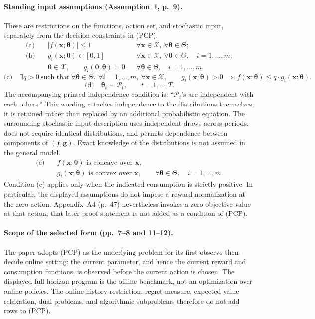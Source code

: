 \documentclass{article}
\begin{document}
\paragraph{Standing input assumptions (Assumption~1, p.~9).}
These are restrictions on the functions, action set, and stochastic input, separately from the decision constraints in (PCP).
\begin{align*}
\text{(a)}\quad
&|f(\boldsymbol{x};\boldsymbol{\theta})|\le 1
&&\forall\boldsymbol{x}\in\mathcal{X},\ \forall\boldsymbol{\theta}\in\Theta;\\
\text{(b)}\quad
&g_i(\boldsymbol{x};\boldsymbol{\theta})\in[0,1]
&&\forall\boldsymbol{x}\in\mathcal{X},\ \forall\boldsymbol{\theta}\in\Theta,
\quad i=1,\ldots,m;\\
&\boldsymbol{0}\in\mathcal{X},\qquad g_i(\boldsymbol{0};\boldsymbol{\theta})=0
&&\forall\boldsymbol{\theta}\in\Theta,\quad i=1,\ldots,m.
\end{align*}
\[
\text{(c)}\quad
\exists q>0\ \text{such that}\ 
\forall\boldsymbol{\theta}\in\Theta,\ \forall i=1,\ldots,m,
\ \forall\boldsymbol{x}\in\mathcal{X},\qquad
 g_i(\boldsymbol{x};\boldsymbol{\theta})>0
\ \Longrightarrow\ 
 f(\boldsymbol{x};\boldsymbol{\theta})\le q\cdot g_i(\boldsymbol{x};\boldsymbol{\theta}).
\]
\[
\text{(d)}\quad
\boldsymbol{\theta}_t\sim\mathcal{P}_t,\qquad t=1,\ldots,T.
\]
The accompanying printed independence condition is: ``$\mathcal{P}_t$'s are independent with each others.'' This wording attaches independence to the distributions themselves; it is retained rather than replaced by an additional probabilistic equation. The surrounding stochastic-input description uses independent draws across periods, does not require identical distributions, and permits dependence between components of $(f,\boldsymbol{g})$. Exact knowledge of the distributions is not assumed in the general model.
\[
\begin{aligned}
\text{(e)}\quad
&f(\boldsymbol{x};\boldsymbol{\theta})\text{ is concave over }\boldsymbol{x},\\
&g_i(\boldsymbol{x};\boldsymbol{\theta})\text{ is convex over }\boldsymbol{x},
\qquad\forall\boldsymbol{\theta}\in\Theta,\quad i=1,\ldots,m.
\end{aligned}
\]
Condition (c) applies only when the indicated consumption is strictly positive. In particular, the displayed assumptions do not impose a reward normalization at the zero action. Appendix~A4 (p.~47) nevertheless invokes a zero objective value at that action; that later proof statement is not added as a condition of (PCP).

\paragraph{Scope of the selected form (pp.~7--8 and 11--12).}
The paper adopts (PCP) as the underlying problem for its first-observe-then-decide online setting: the current parameter, and hence the current reward and consumption functions, is observed before the current action is chosen. The displayed full-horizon program is the offline benchmark, not an optimization over online policies. The online history restriction, regret measure, expected-value relaxation, dual problems, and algorithmic subproblems therefore do not add rows to (PCP).
\end{document}
